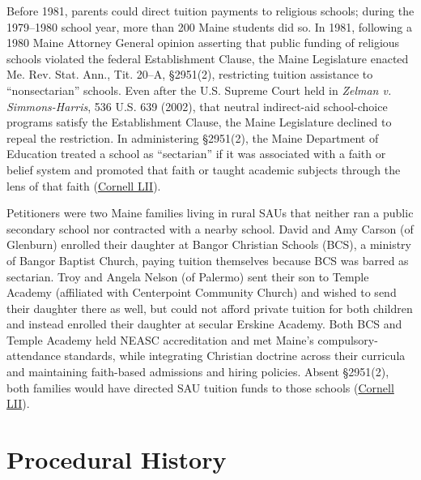 \documentclass[12pt]{article}
\begin{document}
Before 1981, parents could direct tuition payments to religious schools; during the 1979--1980 school year, more than 200 Maine students did so. In 1981, following a 1980 Maine Attorney General opinion asserting that public funding of religious schools violated the federal Establishment Clause, the Maine Legislature enacted Me. Rev. Stat. Ann., Tit. 20--A, \S 2951(2), restricting tuition assistance to ``nonsectarian'' schools. Even after the U.S. Supreme Court held in \textit{Zelman v. Simmons-Harris}, 536 U.S. 639 (2002), that neutral indirect-aid school-choice programs satisfy the Establishment Clause, the Maine Legislature declined to repeal the restriction. In administering \S 2951(2), the Maine Department of Education treated a school as ``sectarian'' if it was associated with a faith or belief system and promoted that faith or taught academic subjects through the lens of that faith (\href{https://www.law.cornell.edu/supremecourt/text/20-1088}{Cornell LII}).

Petitioners were two Maine families living in rural SAUs that neither ran a public secondary school nor contracted with a nearby school. David and Amy Carson (of Glenburn) enrolled their daughter at Bangor Christian Schools (BCS), a ministry of Bangor Baptist Church, paying tuition themselves because BCS was barred as sectarian. Troy and Angela Nelson (of Palermo) sent their son to Temple Academy (affiliated with Centerpoint Community Church) and wished to send their daughter there as well, but could not afford private tuition for both children and instead enrolled their daughter at secular Erskine Academy. Both BCS and Temple Academy held NEASC accreditation and met Maine's compulsory-attendance standards, while integrating Christian doctrine across their curricula and maintaining faith-based admissions and hiring policies. Absent \S 2951(2), both families would have directed SAU tuition funds to those schools (\href{https://www.law.cornell.edu/supremecourt/text/20-1088}{Cornell LII}).

\section{Procedural History}
\end{document}
